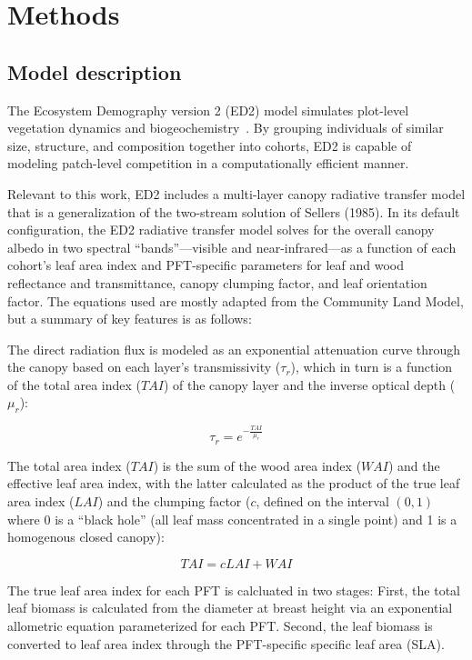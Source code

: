 \section{Methods}

\subsection{Model description}

The Ecosystem Demography version 2 (ED2) model simulates plot-level vegetation dynamics and biogeochemistry~\cite{Moorcroft_2001_ED,Medvigy_2009_ED2}.
By grouping individuals of similar size, structure, and composition together into cohorts, ED2 is capable of modeling patch-level competition in a computationally efficient manner.

Relevant to this work, ED2 includes a multi-layer canopy radiative transfer model that is a generalization of the two-stream solution of Sellers (1985). \nocite{SELLERS_1985_canopy}
In its default configuration, the ED2 radiative transfer model solves for the overall canopy albedo in two spectral ``bands''---visible and near-infrared---as a function of each cohort's leaf area index and PFT-specific parameters for leaf and wood reflectance and transmittance, canopy clumping factor, and leaf orientation factor.
The equations used are mostly adapted from the Community Land Model\cite{clm45_note}, but a summary of key features is as follows:

The direct radiation flux is modeled as an exponential attenuation curve through the canopy based on each layer's transmissivity ($\tau_r$),
which in turn is a function of the total area index ($TAI$) of the canopy layer and the inverse optical depth ($\mu_r$):

\begin{equation}\label{eq:tai}
  \tau_r = e ^ {- \frac{TAI}{\mu_r}}
\end{equation}

The total area index ($TAI$) is the sum of the wood area index ($WAI$) and the effective leaf area index, with the latter calculated as the product of the true leaf area index ($LAI$) and the clumping factor ($c$, defined on the interval $(0, 1)$ where 0 is a ``black hole'' (all leaf mass concentrated in a single point) and 1 is a homogenous closed canopy):

\begin{equation}
  TAI = c LAI + WAI
\end{equation}

The true leaf area index for each PFT is calcluated in two stages:
First, the total leaf biomass is calculated from the diameter at breast height via an exponential allometric equation parameterized for each PFT\@.
Second, the leaf biomass is converted to leaf area index through the PFT-specific specific leaf area (SLA).

